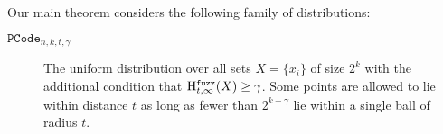 
\label{sec:family}
Our main theorem considers the following family of distributions:

\begin{description}
    
    \item[$\mathtt{PCode}_{n, k, t, \gamma}$] The uniform distribution over all sets $X = \{x_i\}$ of size $2^k$ with the additional condition that $\mathrm{H}^{\mathtt{fuzz}}_{t,\infty}(X) \ge \gamma$.  Some points are allowed to lie within distance $t$ as long as fewer than $2^{k-\gamma}$ lie within a single ball of radius $t$.
\end{description}

